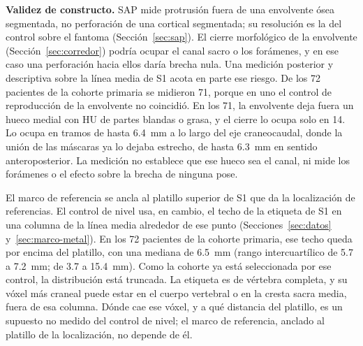 
\textbf{Validez de constructo.} SAP mide protrusión fuera de una envolvente ósea segmentada, no perforación de una cortical segmentada; su resolución es la del control sobre el fantoma (Sección~\ref{sec:sap}). El cierre morfológico de la envolvente (Sección~\ref{sec:corredor}) podría ocupar el canal sacro o los forámenes, y en ese caso una perforación hacia ellos daría brecha nula. Una medición posterior y descriptiva sobre la línea media de S1 acota en parte ese riesgo. De los 72 pacientes de la cohorte primaria se midieron 71, porque en uno el control de reproducción de la envolvente no coincidió. En los 71, la envolvente deja fuera un hueco medial con HU de partes blandas o grasa, y el cierre lo ocupa solo en 14. Lo ocupa en tramos de hasta 6.4~mm a lo largo del eje craneocaudal, donde la unión de las máscaras ya lo dejaba estrecho, de hasta 6.3~mm en sentido anteroposterior. La medición no establece que ese hueco sea el canal, ni mide los forámenes o el efecto sobre la brecha de ninguna pose.

El marco de referencia se ancla al platillo superior de S1 que da la localización de referencias. El control de nivel usa, en cambio, el techo de la etiqueta de S1 en una columna de la línea media alrededor de ese punto (Secciones~\ref{sec:datos} y~\ref{sec:marco-metal}). En los 72 pacientes de la cohorte primaria, ese techo queda por encima del platillo, con una mediana de 6.5~mm (rango intercuartílico de 5.7 a 7.2~mm; de 3.7 a 15.4~mm). Como la cohorte ya está seleccionada por ese control, la distribución está truncada. La etiqueta es de vértebra completa, y su vóxel más craneal puede estar en el cuerpo vertebral o en la cresta sacra media, fuera de esa columna. Dónde cae ese vóxel, y a qué distancia del platillo, es un supuesto no medido del control de nivel; el marco de referencia, anclado al platillo de la localización, no depende de él.

